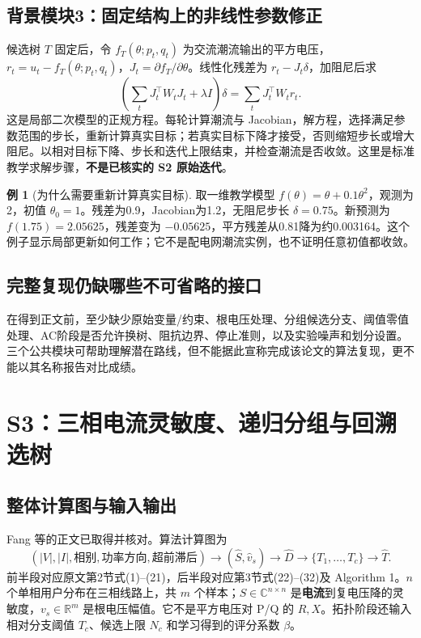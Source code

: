 \documentclass[UTF8,11pt,fontset=fandol,openany,oneside]{ctexbook}
\newcommand{\R}{\mathbb{R}}
\theoremstyle{definition}
\newtheorem{example}[theorem]{例}
\theoremstyle{remark}
\numberwithin{equation}{chapter}
\begin{document}
\subsection{背景模块3：固定结构上的非线性参数修正}
候选树 $T$ 固定后，令 $f_T(\theta;p_t,q_t)$ 为交流潮流输出的平方电压，$r_t=u_t-f_T(\theta;p_t,q_t)$，$J_t=\partial f_T/\partial\theta$。线性化残差为 $r_t-J_t\delta$，加阻尼后求
\begin{equation}
 \left(\sum_tJ_t^\top W_tJ_t+\lambda I\right)\delta
 =\sum_tJ_t^\top W_tr_t.\label{eq:tb-gn}
\end{equation}
这是局部二次模型的正规方程。每轮计算潮流与 Jacobian，解方程，选择满足参数范围的步长，重新计算真实目标；若真实目标下降才接受，否则缩短步长或增大阻尼。以相对目标下降、步长和迭代上限结束，并检查潮流是否收敛。这里是标准教学求解步骤，\textbf{不是已核实的 S2 原始迭代}。

\begin{example}[为什么需要重新计算真实目标]
取一维教学模型 $f(\theta)=\theta+0.1\theta^2$，观测为2，初值 $\theta_0=1$。残差为0.9，Jacobian为1.2，无阻尼步长 $\delta=0.75$。新预测为 $f(1.75)=2.05625$，残差变为 $-0.05625$，平方残差从0.81降为约0.003164。这个例子显示局部更新如何工作；它不是配电网潮流实例，也不证明任意初值都收敛。
\end{example}

\subsection{完整复现仍缺哪些不可省略的接口}
在得到正文前，至少缺少原始变量/约束、根电压处理、分组候选分支、阈值零值处理、AC阶段是否允许换树、阻抗边界、停止准则，以及实验噪声和划分设置。三个公共模块可帮助理解潜在路线，但不能据此宣称完成该论文的算法复现，更不能以其名称报告对比成绩。

\section{S3：三相电流灵敏度、递归分组与回溯选树}
\subsection{整体计算图与输入输出}
Fang 等\citep{S3}的正文已取得并核对。算法计算图为
\begin{equation*}
 (|V|,|I|,\text{相别},\text{功率方向},\text{超前滞后})
 \longrightarrow(\widehat S,\widehat v_s)
 \longrightarrow\widehat D
 \longrightarrow\{T_1,\ldots,T_c\}
 \longrightarrow\widehat T.
\end{equation*}
前半段对应原文第2节式(1)--(21)，后半段对应第3节式(22)--(32)及 Algorithm 1。$n$ 个单相用户分布在三相线路上，共 $m$ 个样本；$S\in\mathbb C^{n\times n}$ 是\textbf{电流}到复电压降的灵敏度，$v_s\in\R^m$ 是根电压幅值。它不是平方电压对 P/Q 的 $R,X$。拓扑阶段还输入相对分支阈值 $T_c$、候选上限 $N_c$ 和学习得到的评分系数 $\beta$。
\end{document}
